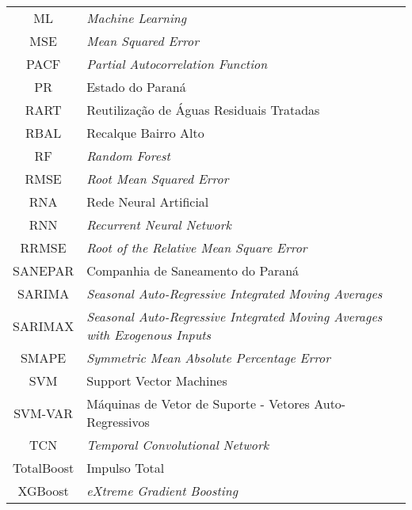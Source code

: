 \begin{tabular}{cp{}}
	ML & \textit{Machine Learning}	\\
	MSE & \textit{Mean Squared Error}\\
	PACF & \textit{Partial Autocorrelation Function}\\
	PR & Estado do Paraná\\
	RART & Reutilização de Águas Residuais Tratadas\\
	RBAL & Recalque Bairro Alto\\
	RF & \textit{Random Forest}\\
	RMSE & \textit{Root Mean Squared Error}\\
	RNA & Rede Neural Artificial\\
	RNN & \textit{Recurrent Neural Network}\\
	RRMSE & \textit{Root of the Relative Mean Square Error}\\
	SANEPAR & Companhia de Saneamento do Paraná \\
	SARIMA & \textit{Seasonal Auto-Regressive Integrated Moving Averages} \\
	SARIMAX & \textit{Seasonal Auto-Regressive Integrated Moving Averages with Exogenous Inputs} \\
	SMAPE &  \textit{Symmetric Mean Absolute Percentage Error}\\
	SVM & Support Vector Machines \\
	SVM-VAR & Máquinas de Vetor de Suporte - Vetores Auto-Regressivos\\
	TCN & \textit{Temporal Convolutional Network} \\
	TotalBoost & Impulso Total\\
	XGBoost & \textit{eXtreme Gradient Boosting}
\end{tabular}
